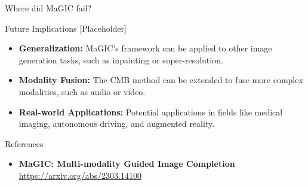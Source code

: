 \documentclass{beamer}
\begin{document}
\begin{frame}{Where did MaGIC fail?}

\end{frame}

\begin{frame}{Future Implications [Placeholder]}
    \begin{itemize}
        \item \textbf{Generalization:} MaGIC's framework can be applied to other image generation tasks, such as inpainting or super-resolution.
        \item \textbf{Modality Fusion:} The CMB method can be extended to fuse more complex modalities, such as audio or video.
        \item \textbf{Real-world Applications:} Potential applications in fields like medical imaging, autonomous driving, and augmented reality.
    \end{itemize}
    
\end{frame}

\begin{frame}{References}
    \begin{itemize}
        \item \textbf{MaGIC:  Multi-modality Guided Image Completion} \\
        \url{https://arxiv.org/abs/2303.14100}
    \end{itemize}
\end{frame}
\end{document}
